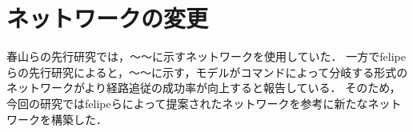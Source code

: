 \section{ネットワークの変更}
春山らの先行研究では，～～に示すネットワークを使用していた．
一方でfelipeらの先行研究によると，～～に示す，モデルがコマンドによって分岐する形式のネットワークがより経路追従の成功率が向上すると報告している．
そのため，今回の研究ではfelipeらによって提案されたネットワークを参考に新たなネットワークを構築した．
